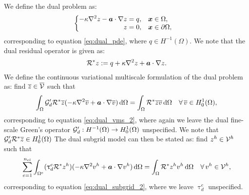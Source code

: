 We define the dual problem as:
%
\begin{gather}
\begin{cases}
\begin{aligned}
-\kappa \nabla^2 {z} - \boldsymbol{a} \cdot \nabla {z} &= q, & & \boldsymbol{x} \in \Omega, \\
z &= 0, & & \boldsymbol{x} \in \partial \Omega,
\end{aligned}
\end{cases}
\label{eq:app_dual_pde}
\end{gather}
%
corresponding to equation \eqref{eq:dual_pde},
where $q \in H^{-1}(\Omega)$. We note that the dual residual
operator is given as:
%
\begin{gather}
\mathcal{R}^* z := q + \kappa \nabla^2 {z} + \boldsymbol{a} \cdot \nabla {z}.
\label{eq:app_dual_residual}
\end{gather}
%
We define the continuous variational multiscale formulation
of the dual problem as: find $\overline{z} \in \overline{\mathcal{V}}$ such that
%
\begin{gather}
\int_{\Omega} \mathcal{G}'_d \mathcal{R}^* \overline{z} (-\kappa \nabla^2 {\overline{v}} + \boldsymbol{a} \cdot \nabla {\overline{v}}) \, \text{d} \Omega =
\int_{\Omega} \mathcal{R}^* \overline{z} \overline{v} \, \text{d} \Omega
\quad \forall \, \overline{v} \in H^1_0(\Omega),
\label{eq:app_dual_vms}
\end{gather}
corresponding to equation \eqref{eq:dual_vms_2}, where again
we leave the dual fine-scale Green's operator
$\mathcal{G}'_d : H^{-1}(\Omega) \to H^1_0(\Omega)$ unspecified.
We note that $\mathcal{G}'_d \mathcal{R}^* \overline{z} \in H^1_0(\Omega)$
The dual subgrid model can then be stated as: find
$z^h \in \mathcal{V}^h$ such that
%
\begin{gather}
\sum_{e=1}^{n_{el}} \int_{\Omega^e} (\uptau^e_d \mathcal{R}^* z^h) (-\kappa \nabla^2 {v^h} + \boldsymbol{a} \cdot \nabla {v^h})
\, \text{d} \Omega =
\int_{\Omega} \mathcal{R}^* z^h v^h \, \text{d} \Omega
\quad \forall \, v^h \in \mathcal{V}^h,
\label{eq:app_dual_subgrid}
\end{gather}
%
corresponding to equation \eqref{eq:dual_subgrid_2}, where we leave
$\uptau^e_d$ unspecified.

